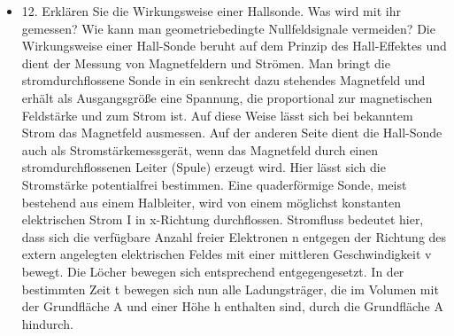 \begin{itemize}
\item 12. Erklären Sie die Wirkungsweise einer Hallsonde. Was wird mit ihr gemessen? Wie kann man
geometriebedingte Nullfeldsignale vermeiden?
\newline Die Wirkungsweise einer Hall-Sonde beruht auf dem Prinzip des Hall-Effektes und dient der Messung von Magnetfeldern und Strömen.
Man bringt die stromdurchflossene Sonde in ein senkrecht dazu stehendes Magnetfeld und erhält als Ausgangsgröße eine Spannung, die proportional zur magnetischen Feldstärke und zum Strom ist. Auf diese Weise lässt sich bei bekanntem Strom das Magnetfeld ausmessen. Auf der anderen Seite dient die Hall-Sonde auch als Stromstärkemessgerät, wenn das Magnetfeld durch einen stromdurchflossenen Leiter (Spule) erzeugt wird. Hier lässt sich die Stromstärke potentialfrei bestimmen. 
Eine quaderförmige Sonde, meist bestehend aus einem Halbleiter, wird von einem möglichst konstanten elektrischen Strom I in x-Richtung durchflossen. Stromfluss bedeutet hier, dass sich die verfügbare Anzahl freier Elektronen n entgegen der Richtung des extern angelegten elektrischen Feldes mit einer mittleren Geschwindigkeit v bewegt. Die Löcher bewegen sich entsprechend entgegengesetzt. In der bestimmten Zeit t bewegen sich nun alle Ladungsträger, die im Volumen mit der Grundfläche A und einer Höhe h enthalten sind, durch die Grundfläche A hindurch.


\end{itemize}
